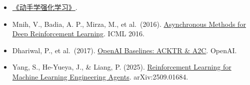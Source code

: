 \vspace{0.25em}
\begin{itemize}
\tightlist
\item
  \href{https://hrl.boyuai.com/}{《动手学强化学习》}.
\item
  Mnih, V., Badia, A. P., Mirza, M., et al.~(2016). \href{https://proceedings.mlr.press/v48/mniha16.html}{Asynchronous Methods for Deep Reinforcement Learning}. ICML 2016.
\item
  Dhariwal, P., et al.~(2017). \href{https://openai.com/index/openai-baselines-acktr-a2c/}{OpenAI Baselines: ACKTR \& A2C}. OpenAI.
\item
  Yang, S., He-Yueya, J., \& Liang, P. (2025). \href{https://arxiv.org/abs/2509.01684}{Reinforcement Learning for Machine Learning Engineering Agents}. arXiv:2509.01684.
\end{itemize}

\clearpage
